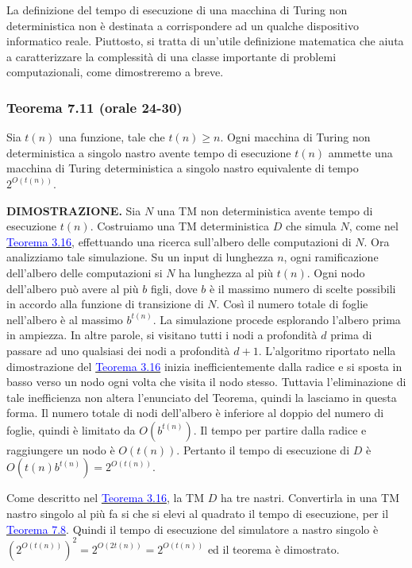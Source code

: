 \documentclass{article}
\begin{document}
La definizione del tempo di esecuzione di una macchina di Turing non deterministica non è destinata a corrispondere ad un qualche dispositivo informatico reale.
Piuttosto, si tratta di un'utile definizione matematica che aiuta a caratterizzare la complessità di una classe importante di problemi computazionali, come dimostreremo a breve.
\newpage
\subsubsection{Teorema 7.11 (orale 24-30)}
\label{teorema-7.11}
\begin{tcolorbox}[colback=yellow!10!white, colframe=yellow!50!black, title=Teorema 7.11]
    Sia $t(n)$ una funzione, tale che $t(n) \geq n$.
    Ogni macchina di Turing non deterministica a singolo nastro avente tempo di esecuzione $t(n)$ ammette una macchina di Turing deterministica a singolo nastro equivalente di tempo $2^{O(t(n))}$.
\end{tcolorbox}

\hbox{\textbf{DIMOSTRAZIONE.}}
Sia $N$ una TM non deterministica avente tempo di esecuzione $t(n)$.
Costruiamo una TM deterministica $D$ che simula $N$, come nel \hyperref[teorema-3.16]{\textcolor{blue}{Teorema 3.16}}, effettuando una ricerca sull'albero delle computazioni di $N$.
Ora analizziamo tale simulazione.
Su un input di lunghezza $n$, ogni ramificazione dell'albero delle computazioni si $N$ ha lunghezza al più $t(n)$.
Ogni nodo dell'albero può avere al più $b$ figli, dove $b$ è il massimo numero di scelte possibili in accordo alla funzione di transizione di $N$.
Così il numero totale di foglie nell'albero è al massimo $b^{t(n)}$.
La simulazione procede esplorando l'albero prima in ampiezza.
In altre parole, si visitano tutti i nodi a profondità $d$ prima di passare ad uno qualsiasi dei nodi a profondità $d + 1$.
L'algoritmo riportato nella dimostrazione del \hyperref[teorema-3.16]{\textcolor{blue}{Teorema 3.16}} inizia inefficientemente dalla radice e si sposta in basso verso un nodo ogni volta che visita il nodo stesso.
Tuttavia l'eliminazione di tale inefficienza non altera l'enunciato del Teorema, quindi la lasciamo in questa forma.
Il numero totale di nodi dell'albero è inferiore al doppio del numero di foglie, quindi è limitato da $O(b^{t(n)})$.
Il tempo per partire dalla radice e raggiungere un nodo è $O(t(n))$.
Pertanto il tempo di esecuzione di $D$ è $O(t(n)b^{t(n)}) = 2^{O(t(n))}$.

Come descritto nel \hyperref[teorema-3.16]{\textcolor{blue}{Teorema 3.16}}, la TM $D$ ha tre nastri.
Convertirla in una TM nastro singolo al più fa si che si elevi al quadrato il tempo di esecuzione, per il \hyperref[teorema-7.8]{\textcolor{blue}{Teorema 7.8}}.
Quindi il tempo di esecuzione del simulatore a nastro singolo è $(2^{O(t(n))})^2 = 2^{O(2t(n))} = 2^{O(t(n))}$ ed il teorema è dimostrato.
\end{document}
